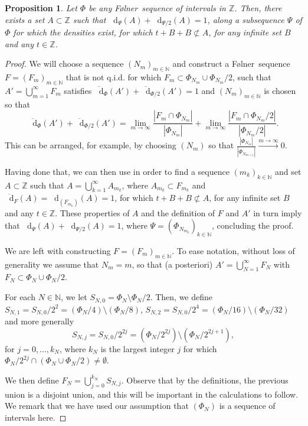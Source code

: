 \documentclass[reqno]{amsart}
\def\Z{{\mathbb Z}}
\def\N{{\mathbb N}}
\newcommand*\diff{\mathop{}\!\mathrm{d}}
\newtheorem{proposition}[theorem]{Proposition}
\theoremstyle{definition}
\theoremstyle{remark}
\theoremstyle{remark}
\def\N{{\mathbb N}}
\newcommand{\Folner}{F\o{}lner}
\begin{document}
\begin{proposition}\label{optimality in Z}
Let $\Phi$ be any \Folner\ sequence of intervals in $\Z$. 
Then, there 
exists a set $A\subset \Z$ such that 
$\diff_{\Psi}(A)+\diff_{\Psi/2}(A)=1$,
along a subsequence $\Psi$ of $\Phi$ for which the densities exist, for which $t+B+B \not \subset A$, for any infinite set $B$ and 
any $t\in \Z$.
\end{proposition}

\begin{proof}    
We will choose a sequence $(N_m)_{m\in \N}$ and construct a \Folner\ sequence $F=(F_m)_{m\in \N}$ that 
is not q.i.d. for which 
$F_m\subset \Phi_{N_m}\cup \Phi_{N_m}/2$, such that $A'=\bigcup_{m=1}^{\infty} F_m$ satisfies $\overline{\diff}_{\Phi}(A')+\overline{\diff}_{\Phi/2}(A')=1$ and $(N_m)_{m\in \N}$ is chosen so that 
$$\overline{\diff}_{\Phi}(A')+\overline{\diff}_{\Phi/2}(A')=\lim_{m\to \infty} \frac{ |F_m \cap \Phi_{N_m}|}{|\Phi_{N_m}|}+\lim_{m\to \infty} \frac{ |F_m \cap \Phi_{N_m}/2|}{|\Phi_{N_m}/2|}.$$
This can be arranged, for example, by choosing $(N_m)$ so that
$\frac{|\Phi_{N_m}|}{|\Phi_{N_{m+1}}|}\xrightarrow{m\to \infty} 0$.

Having done that, we can then use 
\cite[Proposition 5.4] {charamaras_kousek_mountakis_radic2025BBingroups} in order to 
find a sequence $(m_k)_{k\in \N}$ and set $A\subset \Z$ such 
that 
$A=\bigcup_{k=1}^{\infty} A_{m_k}$, where 
$A_{m_k}\subset F_{m_k}$ and $\overline{\diff}_{F}(A)=\diff_{(F_{m_k})}(A)=1$,
for which $t+B+B \not \subset A$, for any infinite set $B$ 
and 
any $t\in \Z$. These properties of $A$ and the definition of $F$ and $A'$ in turn imply that $\diff_{\Psi}(A)+\diff_{\Psi/2}(A)=1$, where $\Psi=(\Phi_{N_{m_k}})_{k\in \N}$, concluding the proof. 

We are left with constructing $F=(F_m)_{m\in \N}$.
To ease notation, without loss of generality we assume that $N_m=m$, so that (a posteriori) $A'=\bigcup_{N=1}^{\infty}F_{N}$ with $F_N\subset \Phi_N \cup \Phi_N/2$.

For each $N\in \N$, we let $S_{N,0}=\Phi_N\setminus \Phi_N/2$. 
Then, we define $S_{N,1}=S_{N,0}/2^{2}=(\Phi_N/4)\setminus (\Phi_N/8)$, $S_{N,2}=S_{N,0}/2^{4}=(\Phi_N/16)\setminus (\Phi_N/32)$ and more generally
$$S_{N,j}=S_{N,0}/2^{2j}=(\Phi_N/2^{2j})\setminus (\Phi_N/2^{2j+1}),$$
for $j=0,\ldots,k_N$, where $k_N$ is the largest integer $j$ 
for which $\Phi_N/2^{2j} \cap \left(\Phi_N\cup \Phi_N/2\right) \neq \emptyset$. 

We then define $F_N=\bigcup_{j=0}^{k_N} S_{N,j}$. Observe 
that by the definitions, the previous 
union is a disjoint union, and this will be important in the 
calculations to follow. We remark that we have used our 
assumption that $(\Phi_N)$ is a sequence of intervals here. 


\end{proof}
\end{document}
